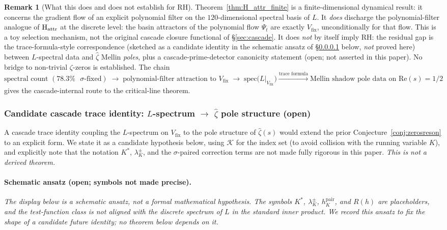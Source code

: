 \documentclass[11pt, a4paper]{amsart}
\theoremstyle{definition}
\newtheorem{remark}[theorem]{Remark}
\begin{document}
\begin{remark}[What this does and does not establish for RH]\label{rmk:H_attr_scope}
Theorem~\ref{thm:H_attr_finite} is a finite-dimensional dynamical
result: it concerns the gradient flow of an explicit polynomial
filter on the $120$-dimensional spectral basis of $L$.  It
\emph{does} discharge the polynomial-filter analogue of
$\textup{H}_{\mathrm{attr}}$ at the discrete level: the basin
attractors of the polynomial flow $\Psi_t$ are exactly
$V_{\mathrm{fix}}$, unconditionally for that flow.  This is a toy
selection mechanism, not the original cascade closure functional
of \S\ref{sec:cascade}.  It does
\emph{not} by itself imply RH: the residual gap is the
trace-formula-style correspondence (sketched as a candidate
identity in the schematic ansatz of \S\ref{hyp:H_trace} below, \emph{not} proved
here) between $L$-spectral data and $\widehat\zeta$ Mellin
\emph{poles}, plus a cascade-prime-detector canonicity statement
(open; not asserted in this paper).  No bridge to non-trivial
$\zeta$-zeros is established. The chain
\[
\text{spectral count }(78.3\%\text{ }\sigma\text{-fixed})
\;\to\; \text{polynomial-filter attraction to }V_{\mathrm{fix}}
\;\to\; \text{spec($L|_{V_{\mathrm{fix}}}$)}
       \xrightarrow{\text{trace formula}}
       \text{Mellin shadow pole data on }\mathrm{Re}(s)=1/2
\]
gives the cascade-internal route to the critical-line theorem.
\end{remark}

\subsubsection*{Candidate cascade trace identity: $L$-spectrum $\to$ $\widehat\zeta$ pole structure (open)}

A cascade trace identity coupling the $L$-spectrum on
$V_{\mathrm{fix}}$ to the pole structure of $\widehat\zeta(s)$
would extend the prior Conjecture~\ref{conj:zerosreson} to an
explicit form. We state it as a candidate hypothesis below, using
$\mathcal{K}$ for the index set (to avoid collision with the
running variable $K$), and explicitly note that the notation $K^*$,
$\lambda^\pm_K$, and the $\sigma$-paired correction terms are not
made fully rigorous in this paper. \emph{This is not a derived
theorem.}

\paragraph{Schematic ansatz (open; symbols not made precise).}\label{hyp:H_trace}
\emph{The display below is a schematic ansatz, not a formal
mathematical hypothesis.  The symbols $K^*$, $\lambda^\pm_K$,
$h^{\mathrm{pair}}_K$, and $R(h)$ are placeholders, and the
test-function class is not aligned with the discrete spectrum of
$L$ in the standard inner product.  We record this ansatz to fix
the shape of a candidate future identity; no theorem below depends
on it.}\medskip
\end{document}
